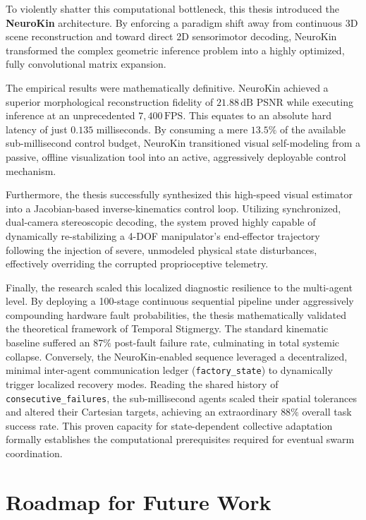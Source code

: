 \documentclass[12pt,a4paper,oneside]{report}
\begin{document}
To violently shatter this computational bottleneck, this thesis introduced the \textbf{NeuroKin} architecture. By enforcing a paradigm shift away from continuous 3D scene reconstruction and toward direct 2D sensorimotor decoding, NeuroKin transformed the complex geometric inference problem into a highly optimized, fully convolutional matrix expansion. 

The empirical results were mathematically definitive. NeuroKin achieved a superior morphological reconstruction fidelity of $21.88\,\mathrm{dB}$ PSNR while executing inference at an unprecedented $7{,}400\,\mathrm{FPS}$. This equates to an absolute hard latency of just $0.135$ milliseconds. By consuming a mere $13.5\%$ of the available sub-millisecond control budget, NeuroKin transitioned visual self-modeling from a passive, offline visualization tool into an active, aggressively deployable control mechanism.

Furthermore, the thesis successfully synthesized this high-speed visual estimator into a Jacobian-based inverse-kinematics control loop. Utilizing synchronized, dual-camera stereoscopic decoding, the system proved highly capable of dynamically re-stabilizing a 4-DOF manipulator's end-effector trajectory following the injection of severe, unmodeled physical state disturbances, effectively overriding the corrupted proprioceptive telemetry.

Finally, the research scaled this localized diagnostic resilience to the multi-agent level. By deploying a 100-stage continuous sequential pipeline under aggressively compounding hardware fault probabilities, the thesis mathematically validated the theoretical framework of Temporal Stigmergy. The standard kinematic baseline suffered an $87\%$ post-fault failure rate, culminating in total systemic collapse. Conversely, the NeuroKin-enabled sequence leveraged a decentralized, minimal inter-agent communication ledger (\texttt{factory\_state}) to dynamically trigger localized recovery modes. Reading the shared history of \texttt{consecutive\_failures}, the sub-millisecond agents scaled their spatial tolerances and altered their Cartesian targets, achieving an extraordinary $88\%$ overall task success rate. This proven capacity for state-dependent collective adaptation formally establishes the computational prerequisites required for eventual swarm coordination.

\section{Roadmap for Future Work}
\end{document}
